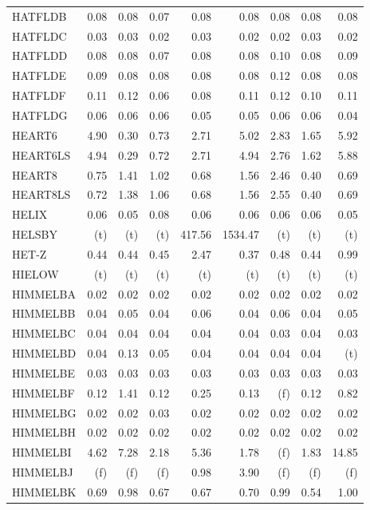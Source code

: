 \documentclass[11pt,twoside]{article}
\begin{document}
{\begin{longtable}[c]{|l|r|r|r|r|r|r|r|r|}
HATFLDB & 0.08 & 0.08 & 0.07 & 0.08 & 0.08 & 0.08 & 0.08 & 0.08 \\
HATFLDC & 0.03 & 0.03 & 0.02 & 0.03 & 0.02 & 0.02 & 0.03 & 0.02 \\
HATFLDD & 0.08 & 0.08 & 0.07 & 0.08 & 0.08 & 0.10 & 0.08 & 0.09 \\
HATFLDE & 0.09 & 0.08 & 0.08 & 0.08 & 0.08 & 0.12 & 0.08 & 0.08 \\
HATFLDF & 0.11 & 0.12 & 0.06 & 0.08 & 0.11 & 0.12 & 0.10 & 0.11 \\
HATFLDG & 0.06 & 0.06 & 0.06 & 0.05 & 0.05 & 0.06 & 0.06 & 0.04 \\
HEART6 & 4.90 & 0.30 & 0.73 & 2.71 & 5.02 & 2.83 & 1.65 & 5.92 \\
HEART6LS & 4.94 & 0.29 & 0.72 & 2.71 & 4.94 & 2.76 & 1.62 & 5.88 \\
HEART8 & 0.75 & 1.41 & 1.02 & 0.68 & 1.56 & 2.46 & 0.40 & 0.69 \\
HEART8LS & 0.72 & 1.38 & 1.06 & 0.68 & 1.56 & 2.55 & 0.40 & 0.69 \\
HELIX & 0.06 & 0.05 & 0.08 & 0.06 & 0.06 & 0.06 & 0.06 & 0.05 \\
HELSBY & (t) & (t) & (t) & 417.56 & 1534.47 & (t) & (t) & (t) \\
HET-Z & 0.44 & 0.44 & 0.45 & 2.47 & 0.37 & 0.48 & 0.44 & 0.99 \\
HIELOW & (t) & (t) & (t) & (t) & (t) & (t) & (t) & (t) \\
HIMMELBA & 0.02 & 0.02 & 0.02 & 0.02 & 0.02 & 0.02 & 0.02 & 0.02 \\
HIMMELBB & 0.04 & 0.05 & 0.04 & 0.06 & 0.04 & 0.06 & 0.04 & 0.05 \\
HIMMELBC & 0.04 & 0.04 & 0.04 & 0.04 & 0.04 & 0.03 & 0.04 & 0.03 \\
HIMMELBD & 0.04 & 0.13 & 0.05 & 0.04 & 0.04 & 0.04 & 0.04 & (t) \\
HIMMELBE & 0.03 & 0.03 & 0.03 & 0.03 & 0.03 & 0.03 & 0.03 & 0.03 \\
HIMMELBF & 0.12 & 1.41 & 0.12 & 0.25 & 0.13 & (f) & 0.12 & 0.82 \\
HIMMELBG & 0.02 & 0.02 & 0.03 & 0.02 & 0.02 & 0.02 & 0.02 & 0.02 \\
HIMMELBH & 0.02 & 0.02 & 0.02 & 0.02 & 0.02 & 0.02 & 0.02 & 0.02 \\
HIMMELBI & 4.62 & 7.28 & 2.18 & 5.36 & 1.78 & (f) & 1.83 & 14.85 \\
HIMMELBJ & (f) & (f) & (f) & 0.98 & 3.90 & (f) & (f) & (f) \\
HIMMELBK & 0.69 & 0.98 & 0.67 & 0.67 & 0.70 & 0.99 & 0.54 & 1.00 \\

\end{longtable}}
\end{document}
